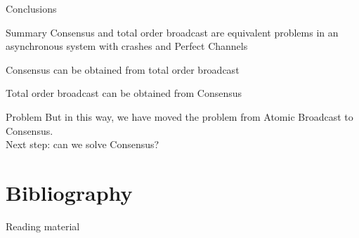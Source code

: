 \begin{frame}{Conclusions}

\begin{block}{Summary}
Consensus and total order broadcast are equivalent problems in an asynchronous system with crashes and Perfect Channels

\BIL
\item Consensus can be obtained from total order broadcast
\item Total order broadcast can be obtained from Consensus
\EIL
\end{block}

\begin{block}{Problem}
But in this way, we have moved the problem from Atomic Broadcast to Consensus.\\
Next step: can we solve Consensus?
\end{block}
 
\end{frame}



\section{Bibliography}

\nocite{hadzilacos94modular}

\begin{frame}{Reading material}

{\footnotesize

  
}

\end{frame}

